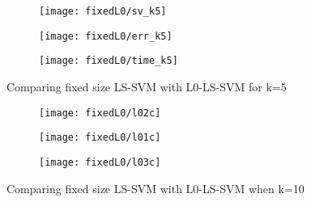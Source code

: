 \documentclass[conference,compsoc]{IEEEtran}
\begin{document}
\begin{figure}[htb]
    \centering %

\begin{subfigure}{0.33\textwidth}
  \texttt{[image: fixedL0/sv\_k5]}
  \label{fig:4}
\end{subfigure}\hfil %
\begin{subfigure}{0.33\textwidth}
  \texttt{[image: fixedL0/err\_k5]}
  \label{fig:5}
\end{subfigure}\hfil %
\begin{subfigure}{0.33\textwidth}
 \texttt{[image: fixedL0/time\_k5]}
  \label{fig:6}
\end{subfigure}
\caption{Comparing fixed size LS-SVM with L0-LS-SVM for k=5}


\begin{subfigure}{0.33\textwidth}
  \texttt{[image: fixedL0/l02c]}

  \label{fig:1}
\end{subfigure}\hfil %
\begin{subfigure}{0.33\textwidth}
   \texttt{[image: fixedL0/l01c]}

  \label{fig:2}
\end{subfigure}\hfil %
\begin{subfigure}{0.33\textwidth}
 \texttt{[image: fixedL0/l03c]}

  \label{fig:3}
\end{subfigure}

\caption{Comparing fixed size LS-SVM with L0-LS-SVM when k=10}
\label{fig:ff}
\end{figure}



\end{document}
